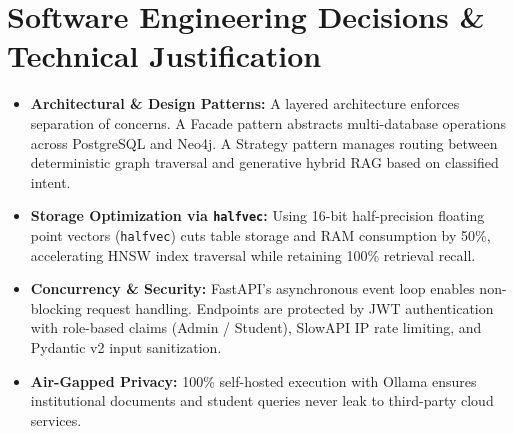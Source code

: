 \documentclass[11pt, a4paper]{article}
\begin{document}
\section{Software Engineering Decisions \& Technical Justification}
\begin{itemize}[noitemsep, topsep=2pt]
    \item \textbf{Architectural \& Design Patterns:} A layered architecture enforces separation of concerns. A Facade pattern abstracts multi-database operations across PostgreSQL and Neo4j. A Strategy pattern manages routing between deterministic graph traversal and generative hybrid RAG based on classified intent.
    \item \textbf{Storage Optimization via \texttt{halfvec}:} Using 16-bit half-precision floating point vectors (\texttt{halfvec}) cuts table storage and RAM consumption by 50\%, accelerating HNSW index traversal while retaining 100\% retrieval recall.
    \item \textbf{Concurrency \& Security:} FastAPI's asynchronous event loop enables non-blocking request handling. Endpoints are protected by JWT authentication with role-based claims (Admin / Student), SlowAPI IP rate limiting, and Pydantic v2 input sanitization.
    \item \textbf{Air-Gapped Privacy:} 100\% self-hosted execution with Ollama ensures institutional documents and student queries never leak to third-party cloud services.
\end{itemize}

\end{document}

